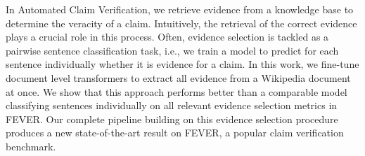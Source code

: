 In Automated Claim Verification, we retrieve evidence from a knowledge base to determine the veracity of a claim. Intuitively, the retrieval of the correct evidence plays a crucial role in this process. Often, evidence selection is tackled as a pairwise sentence classification task, i.e., we train a model to predict for each sentence individually whether it is evidence for a claim. In this work, we fine-tune document level transformers to extract all evidence from a Wikipedia document at once. We show that this approach performs better than a comparable model classifying sentences individually on all relevant evidence selection metrics in FEVER. Our complete pipeline building on this evidence selection procedure produces a new state-of-the-art result on FEVER, a popular claim verification benchmark.
